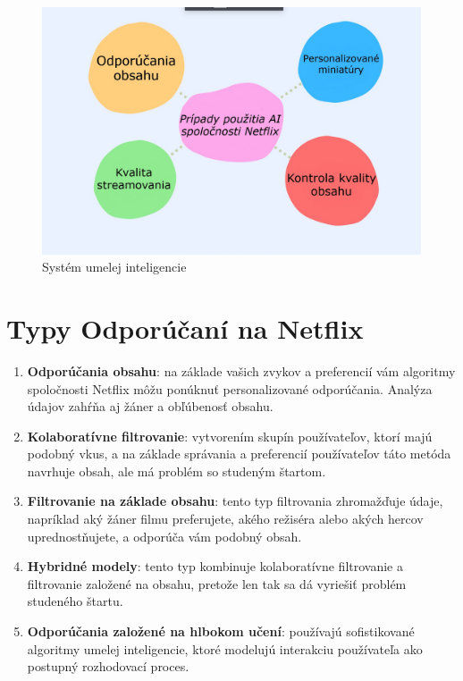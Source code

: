 \documentclass[10pt,slovak,a4paper]{article}
\begin{document}
\begin{figure}[H]
  \centering
  \includegraphics[width=1\textwidth]{Images_tables/AI.jpg}
  \caption{Systém umelej inteligencie}
\end{figure}


\section{Typy Odporúčaní na Netflix}

\begin{enumerate}
    \item \textbf{Odporúčania obsahu}: na základe vašich zvykov a preferencií vám algoritmy spoločnosti Netflix môžu ponúknuť personalizované odporúčania. Analýza údajov zahŕňa aj žáner a obľúbenosť obsahu.\cite{Odp:sys}
    
    \item \textbf{Kolaboratívne filtrovanie}: vytvorením skupín používateľov, ktorí majú podobný vkus, a na základe správania a preferencií používateľov táto metóda navrhuje obsah, ale má problém so studeným štartom.\cite{Chladny:start}
    
    \item \textbf{Filtrovanie na základe obsahu}: tento typ filtrovania zhromažďuje údaje, napríklad aký žáner filmu preferujete, akého režiséra alebo akých hercov uprednostňujete, a odporúča vám podobný obsah.
    
    \item \textbf{Hybridné modely}: tento typ kombinuje kolaboratívne filtrovanie a filtrovanie založené na obsahu, pretože len tak sa dá vyriešiť problém studeného štartu.

    \item \textbf{Odporúčania založené na hlbokom učení}: používajú sofistikované algoritmy umelej inteligencie, ktoré modelujú interakciu používateľa ako postupný rozhodovací proces.
\end{enumerate}    
\end{document}
